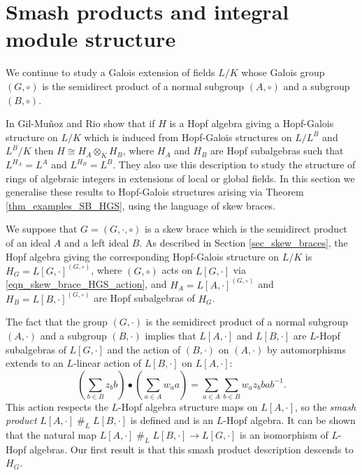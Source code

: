 \documentclass[12pt,a4paper, reqno]{amsart}
\theoremstyle{definition}
\begin{document}
\section{Smash products and integral module structure} \label{sec_smash}

We continue to study a Galois extension of fields $ L/K $ whose Galois group $ (G,\circ) $ is the semidirect product of a normal subgroup $ (A,\circ) $ and a subgroup $ (B,\circ) $. 

In \cite{GR20} Gil-Mu\~{n}oz and Rio show that if $ H $ is a Hopf algebra giving a Hopf-Galois structure on $ L/K $ which is induced from Hopf-Galois structures on $ L/L^{B} $ and $ L^{B}/K $ then $ H \cong  H_{A} \otimes_{K} H_{B} $, where $ H_{A} $ and $ H_{B} $ are Hopf subalgebras such that $ L^{H_{A}} = L^{A} $ and $ L^{H_{B}} = L^{B} $. They also use this description  to study the structure of rings of algebraic integers in extensions of local or global fields. In this section we generalise these results to Hopf-Galois structures arising via Theorem \ref{thm_examples_SB_HGS}, using the language of skew braces.  

We suppose that $ G=(G,\cdot,\circ) $ is a skew brace which is the semidirect product of an ideal $ A $ and a left ideal $ B $. As described in Section \ref{sec_skew_braces}, the Hopf algebra giving the corresponding Hopf-Galois structure on $ L/K $ is $ H_{G} = L[G,\cdot]^{(G,\circ)} $, where $ (G,\circ) $ acts on $ L[G,\cdot] $ via \eqref{eqn_skew_brace_HGS_action}, and $ H_{A} = L[A,\cdot]^{(G,\circ)} $ and $ H_{B} = L[B,\cdot]^{(G,\circ)} $ are Hopf subalgebras of $ H_{G} $.

The fact that the group $ (G,\cdot) $ is the semidirect product of a normal subgroup $ (A,\cdot) $ and a subgroup $ (B,\cdot) $ implies that $ L[A,\cdot] $ and $ L[B,\cdot] $ are $ L $-Hopf subalgebras of $ L[G,\cdot] $ and the action of $ (B,\cdot) $ on $ (A,\cdot) $ by automorphisms extends to an $ L $-linear action of $ L[B,\cdot] $ on $ L[A,\cdot] $:
\begin{equation}
\left( \sum_{b \in B} z_{b} b \right) \bullet \left( \sum_{a \in A} w_{a} a \right) = \sum_{a \in A} \sum_{b \in B} w_{a} z_{b} bab^{-1}.
\end{equation}
This action respects the $ L $-Hopf algebra structure maps on $ L[A,\cdot] $, so the \textit{smash product} $ L[A,\cdot] \; \#_{L} \; L[B,\cdot] $ is defined and is an $ L $-Hopf algebra. It can be shown that the natural map $ L[A,\cdot] \; \#_{L} \; L[B,\cdot] \rightarrow L[G,\cdot] $ is an isomorphism of $ L $-Hopf algebras. Our first result is that this smash product description descends to $ H_{G} $.
\end{document}
